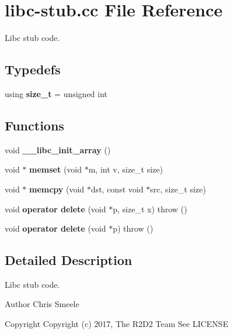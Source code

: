 \hypertarget{libc-stub_8cc}{}\section{libc-\/stub.cc File Reference}
\label{libc-stub_8cc}


Libc stub code.  


\subsection*{Typedefs}
\begin{DoxyCompactItemize}
\item 
\mbox{\label{libc-stub_8cc_afadb78ab5a0fd50f0607f9bc7ae0235a}} 
using {\bfseries size\+\_\+t} = unsigned int
\end{DoxyCompactItemize}
\subsection*{Functions}
\begin{DoxyCompactItemize}
\item 
\mbox{\label{libc-stub_8cc_a5227870c8dd60cda7add3fa24aa00a7b}} 
void {\bfseries \+\_\+\+\_\+libc\+\_\+init\+\_\+array} ()
\item 
\mbox{\label{libc-stub_8cc_a9d9bc4578fa6ef77862846c794b3bcc0}} 
void $\ast$ {\bfseries memset} (void $\ast$m, int v, size\+\_\+t size)
\item 
\mbox{\label{libc-stub_8cc_a221995d01087b6da7d0df8d004c7797b}} 
void $\ast$ {\bfseries memcpy} (void $\ast$dst, const void $\ast$src, size\+\_\+t size)
\item 
\mbox{\label{libc-stub_8cc_a6f9d2861931acb9dad897ad7a62eb23f}} 
void {\bfseries operator delete} (void $\ast$p, size\+\_\+t x)  throw ()
\item 
\mbox{\label{libc-stub_8cc_a86107594327f3a001230df9802cd4422}} 
void {\bfseries operator delete} (void $\ast$p)  throw ()
\end{DoxyCompactItemize}


\subsection{Detailed Description}
Libc stub code. 

\begin{DoxyAuthor}{Author}
Chris Smeele 
\end{DoxyAuthor}
\begin{DoxyCopyright}{Copyright}
Copyright (c) 2017, The R2\+D2 Team  See L\+I\+C\+E\+N\+SE 
\end{DoxyCopyright}
